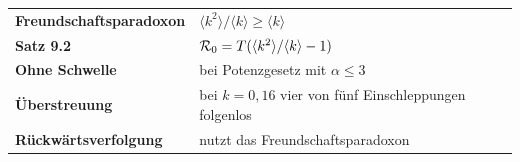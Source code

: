 \begin{merksatz}
\begin{center}
\renewcommand{\arraystretch}{1.5}
\begin{tabular}{@{}P{3.2cm}P{5.4cm}@{}}
\toprule
\textbf{Freundschafts\-paradoxon} & $\langle k^2\rangle/\langle k\rangle \ge \langle k\rangle$\\
\textbf{Satz 9.2} & $\mathcal{R}_0 = T(\langle k^2\rangle/\langle k\rangle - 1)$\\
\textbf{Ohne Schwelle} & bei Potenzgesetz mit $\alpha \le 3$\\
\textbf{Überstreuung} & bei $k=0{,}16$ vier von fünf Einschleppungen folgenlos\\
\textbf{Rückwärts\-verfolgung} & nutzt das Freundschaftsparadoxon\\
\bottomrule
\end{tabular}
\end{center}

\begin{center}
\begin{minipage}{0.88\textwidth}
\end{minipage}
\end{center}
\end{merksatz}

